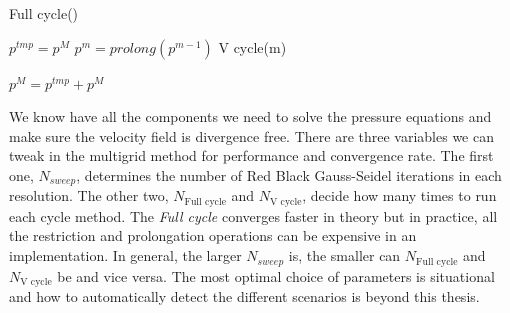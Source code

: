 \begin{algorithm}
\caption{Full cycle()}
\begin{algorithmic}[1]

\STATE $p^{tmp} = p^M$
\STATE $p^m = prolong(p^{m-1})$
\ENDIF
\STATE V cycle(m)

\ENDFOR

\STATE $p^M = p^{tmp} + p^M$

\end{algorithmic}
\label{fullcyclealgorithm}
\end{algorithm}
\noindent
We know have all the components we need to solve the pressure equations and make sure the velocity field is divergence free. There are three variables we can tweak in the multigrid method for performance and convergence rate. The first one, $N_{sweep}$, determines the number of Red Black Gauss-Seidel iterations in each resolution. The other two, $N_{\text{Full cycle}}$ and $N_\text{V cycle}$, decide how many times to run each cycle method. The \emph{Full cycle} converges faster in theory but in practice, all the restriction and prolongation operations can be expensive in an implementation. In general, the larger $N_{sweep}$ is, the smaller can $N_{\text{Full cycle}}$ and $N_\text{V cycle}$ be and vice versa. The most optimal choice of parameters is situational and how to automatically detect the different scenarios is beyond this thesis. 
